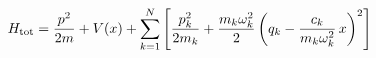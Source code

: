 \documentclass[preview]{standalone}
\begin{document}
\begin{align*}
\special{dvisvgm:raw <g id='unique000'>}H_{\rm tot}=\frac{p^2}{2m}+V(x)+\sum_{k=1}^{N}\left[\frac{p_k^2}{2m_k}+\frac{m_k\omega_k^2}{2}\left(q_k-\frac{c_k}{m_k\omega_k^2}\,x\right)^2\right]\special{dvisvgm:raw </g>}
\end{align*}
\end{document}
